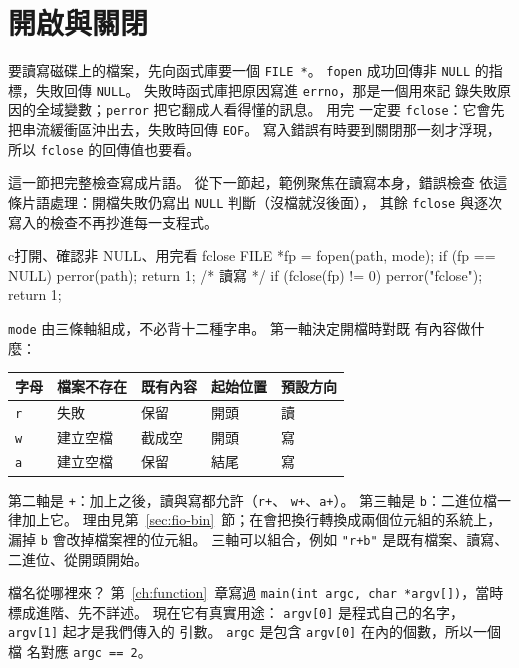 \section{開啟與關閉}
\label{sec:fio-open}

要讀寫磁碟上的檔案，先向函式庫要一個 \texttt{FILE *}。
\texttt{fopen} 成功回傳非 \texttt{NULL} 的指標，失敗回傳
\texttt{NULL}。 失敗時函式庫把原因寫進 \texttt{errno}，那是一個用來記
錄失敗原因的全域變數；\texttt{perror} 把它翻成人看得懂的訊息。 用完
一定要 \texttt{fclose}：它會先把串流緩衝區沖出去，失敗時回傳
\texttt{EOF}。 寫入錯誤有時要到關閉那一刻才浮現，所以
\texttt{fclose} 的回傳值也要看。

這一節把完整檢查寫成片語。 從下一節起，範例聚焦在讀寫本身，錯誤檢查
依這條片語處理：開檔失敗仍寫出 \texttt{NULL} 判斷（沒檔就沒後面），
其餘 \texttt{fclose} 與逐次寫入的檢查不再抄進每一支程式。

\begin{code}{c}{打開、確認非 NULL、用完看 fclose}
FILE *fp = fopen(path, mode);
if (fp == NULL) {
    perror(path);
    return 1;
}
/* 讀寫 */
if (fclose(fp) != 0) {
    perror("fclose");
    return 1;
}
\end{code}

\texttt{mode} 由三條軸組成，不必背十二種字串。 第一軸決定開檔時對既
有內容做什麼：

\begin{center}
\begin{tabular}{|l|l|l|l|l|}
\hline
字母 & 檔案不存在 & 既有內容 & 起始位置 & 預設方向 \\
\hline
\texttt{r} & 失敗 & 保留 & 開頭 & 讀 \\
\texttt{w} & 建立空檔 & 截成空 & 開頭 & 寫 \\
\texttt{a} & 建立空檔 & 保留 & 結尾 & 寫 \\
\hline
\end{tabular}
\end{center}

第二軸是 \texttt{+}：加上之後，讀與寫都允許（\texttt{r+}、
\texttt{w+}、\texttt{a+}）。 第三軸是 \texttt{b}：二進位檔一律加上它。
理由見第~\ref{sec:fio-bin}~節；在會把換行轉換成兩個位元組的系統上，
漏掉 \texttt{b} 會改掉檔案裡的位元組。 三軸可以組合，例如
\texttt{"r+b"} 是既有檔案、讀寫、二進位、從開頭開始。


檔名從哪裡來？ 第~\ref{ch:function}~章寫過 \texttt{main(int argc,
char *argv[])}，當時標成進階、先不詳述。 現在它有真實用途：
\texttt{argv[0]} 是程式自己的名字，\texttt{argv[1]} 起才是我們傳入的
引數。 \texttt{argc} 是包含 \texttt{argv[0]} 在內的個數，所以一個檔
名對應 \texttt{argc == 2}。

